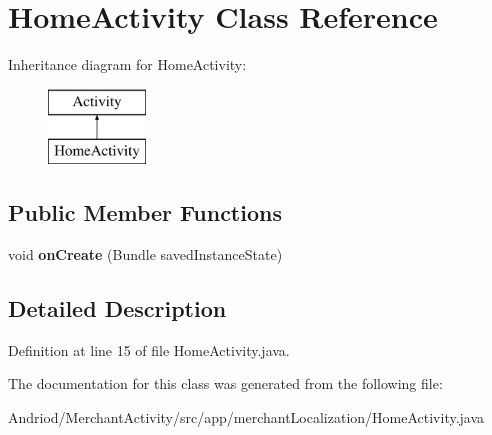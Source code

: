 \hypertarget{classapp_1_1merchant_localization_1_1_home_activity}{\section{Home\-Activity Class Reference}
\label{classapp_1_1merchant_localization_1_1_home_activity}
}
Inheritance diagram for Home\-Activity\-:\begin{figure}[H]
\begin{center}
\leavevmode
\includegraphics[height=2.000000cm]{classapp_1_1merchant_localization_1_1_home_activity}
\end{center}
\end{figure}
\subsection*{Public Member Functions}
\begin{DoxyCompactItemize}
\item 
\hypertarget{classapp_1_1merchant_localization_1_1_home_activity_a85e87cb5ced88dff7c8173ecc4f636d1}{void {\bfseries on\-Create} (Bundle saved\-Instance\-State)}\label{classapp_1_1merchant_localization_1_1_home_activity_a85e87cb5ced88dff7c8173ecc4f636d1}

\end{DoxyCompactItemize}


\subsection{Detailed Description}


Definition at line 15 of file Home\-Activity.\-java.



The documentation for this class was generated from the following file\-:\begin{DoxyCompactItemize}
\item 
Andriod/\-Merchant\-Activity/src/app/merchant\-Localization/Home\-Activity.\-java\end{DoxyCompactItemize}
